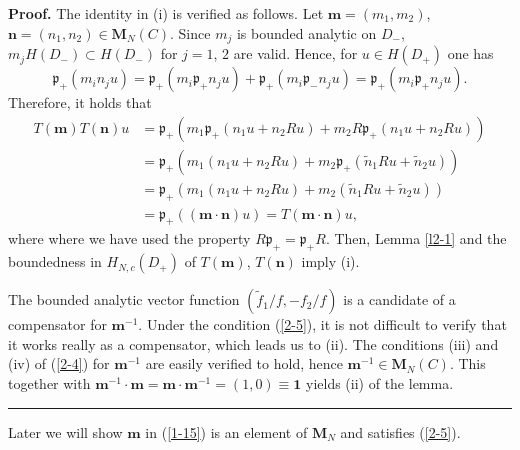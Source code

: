 \documentclass[a4paper]{article}%
\newenvironment{proof}[1][Proof]{\noindent\textbf{#1.} }{\ \rule{0.5em}{0.5em}}
\begin{document}
\begin{proof}
The identity in (i) is verified as follows. Let $\boldsymbol{m}=\left(
m_{1},m_{2}\right)  $, $\boldsymbol{n}=\left(  n_{1},n_{2}\right)
\in\boldsymbol{M}_{N}\left(  C\right)  $. Since $m_{j}$ is bounded analytic on
$D_{-}$, $m_{j}H\left(  D_{-}\right)  \subset H\left(  D_{-}\right)  $ for
$j=1$, $2$ are valid. Hence, for $u\in H\left(  D_{+}\right)  $ one has%
\[
\mathfrak{p}_{+}\left(  m_{i}n_{j}u\right)  =\mathfrak{p}_{+}\left(
m_{i}\mathfrak{p}_{+}n_{j}u\right)  +\mathfrak{p}_{+}\left(  m_{i}%
\mathfrak{p}_{-}n_{j}u\right)  =\mathfrak{p}_{+}\left(  m_{i}\mathfrak{p}%
_{+}n_{j}u\right)  \text{.}%
\]
Therefore, it holds that%
\begin{align*}
T\left(  \boldsymbol{m}\right)  T\left(  \boldsymbol{n}\right)  u  &
=\mathfrak{p}_{+}\left(  m_{1}\mathfrak{p}_{+}\left(  n_{1}u+n_{2}Ru\right)
+m_{2}R\mathfrak{p}_{+}\left(  n_{1}u+n_{2}Ru\right)  \right) \\
&  =\mathfrak{p}_{+}\left(  m_{1}\left(  n_{1}u+n_{2}Ru\right)  +m_{2}%
\mathfrak{p}_{+}\left(  \widetilde{n}_{1}Ru+\widetilde{n}_{2}u\right)  \right)
\\
&  =\mathfrak{p}_{+}\left(  m_{1}\left(  n_{1}u+n_{2}Ru\right)  +m_{2}\left(
\widetilde{n}_{1}Ru+\widetilde{n}_{2}u\right)  \right) \\
&  =\mathfrak{p}_{+}\left(  \left(  \boldsymbol{m}\cdot\boldsymbol{n}\right)
u\right)  =T\left(  \boldsymbol{m}\cdot\boldsymbol{n}\right)  u\text{,}%
\end{align*}
where where we have used the property $R\mathfrak{p}_{+}=\mathfrak{p}_{+}R$.
Then, Lemma \ref{l2-1} and the boundedness in $H_{N,c}\left(  D_{+}\right)  $
of $T\left(  \boldsymbol{m}\right)  $, $T\left(  \boldsymbol{n}\right)  $
imply (i).

The bounded analytic vector function $\left(  \widetilde{f}_{1}/f,-f_{2}%
/f\right)  $ is a candidate of a compensator for $\boldsymbol{m}^{-1}$. Under
the condition (\ref{2-5}), it is not difficult to verify that it works really
as a compensator, which leads us to (ii). The conditions (iii) and (iv) of
(\ref{2-4}) for $\boldsymbol{m}^{-1}$ are easily verified to hold, hence
$\boldsymbol{m}^{-1}\in\boldsymbol{M}_{N}\left(  C\right)  $. This together
with $\boldsymbol{m}^{-1}\cdot\boldsymbol{m}=\boldsymbol{m}\cdot
\boldsymbol{m}^{-1}=\left(  1,0\right)  \equiv\boldsymbol{1}$ yields (ii) of
the lemma.\bigskip
\end{proof}

Later we will show $\boldsymbol{m}$ in (\ref{1-15}) is an element of
$\boldsymbol{M}_{N}$ and satisfies (\ref{2-5}).
\end{document}
